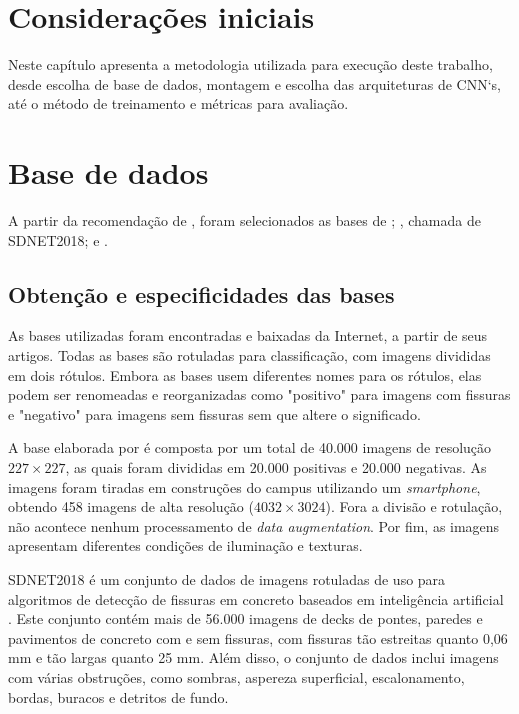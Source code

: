 \section{Considerações iniciais}
Neste capítulo apresenta a metodologia utilizada para execução deste trabalho, desde escolha de base de dados, montagem e escolha das arquiteturas de CNN`s, até o método de treinamento e métricas para avaliação.

\section{Base de dados}
A partir da recomendação de , foram selecionados as bases de ; , chamada de SDNET2018;  e .

\subsection{Obtenção e especificidades das bases}
\label{sub:bases}

As bases utilizadas foram encontradas e baixadas da Internet, a partir de seus artigos. 
Todas as bases são rotuladas para classificação, com imagens divididas em dois rótulos. 
Embora as bases usem diferentes nomes para os rótulos, elas podem ser renomeadas e reorganizadas como "positivo" para imagens com fissuras e "negativo" para imagens sem fissuras sem que altere o significado.

A base elaborada por  é composta por um total de 40.000 imagens de resolução $227 \times 227$, as quais foram divididas em 20.000 positivas e 20.000 negativas.
As imagens foram tiradas em construções do campus  utilizando um \textit{smartphone}, obtendo 458 imagens de alta resolução ($4032 \times 3024$).
Fora a divisão e rotulação, não acontece  nenhum processamento de \textit{data augmentation}.
Por fim, as imagens apresentam diferentes condições de iluminação e texturas.

SDNET2018 é um conjunto de dados de imagens rotuladas de uso para algoritmos de detecção de fissuras em concreto baseados em inteligência artificial \cite{maguire2018sdnet2018}.
Este conjunto contém mais de 56.000 imagens de decks de pontes, paredes e pavimentos de concreto com e sem fissuras, com fissuras tão estreitas quanto 0,06 mm e tão largas quanto 25 mm. 
Além disso, o conjunto de dados inclui imagens com várias obstruções, como sombras, aspereza superficial, escalonamento, bordas, buracos e detritos de fundo.

